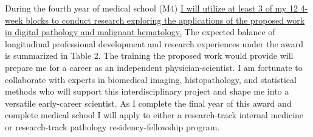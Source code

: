 \documentclass{NIHGrant}
\begin{document}
During the fourth year of medical school (M4) \uline{I will utilize at least 3 of my 12 4-week blocks to conduct research exploring the applications of the proposed work in digital pathology and malignant hematology.} The expected balance of longitudinal professional development and research experiences under the award is summarized in Table 2. The training the proposed work would provide will prepare me for a career as an independent physician-scientist. I am fortunate to collaborate with experts in biomedical imaging, histopathology, and statistical methods who will support this interdisciplinary project and shape me into a versatile early-career scientist. As I complete the final year of this award and complete medical school I will apply to either a research-track internal medicine or research-track pathology residency-fellowship program.



\end{document}
